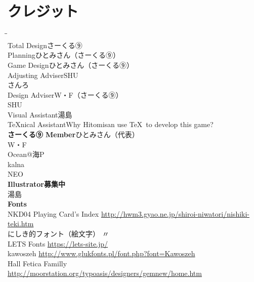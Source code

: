 \documentclass[line_length=22zw,number_of_lines=45,twocolumn]{jlreq}
\newcommand{\hmemph}[1]{\textbf{#1}}
\begin{document}
\onecolumn
\section{クレジット}
\begin{tabbing}
	\hspace{15\zw}\=\hspace{15\zw}\=\kill\\
	Total Design\>さーくる⑨\\
	Planning\>ひとみさん（さーくる⑨）\\
	Game Design\>ひとみさん（さーくる⑨）\\
	Adjusting Adviser\>SHU\\
	\>さんろ\\
	Design Adviser\>W・F（さーくる⑨）\\
	\>SHU\\
	Visual Assistant\>湯島\\
	\TeX nical Assistant\>Why Hitomisan use \TeX\ to develop this game?\\
	\hmemph{さーくる⑨ Member}\>ひとみさん（代表）\\
	\>W・F\\
	\>Ocean@海P\\
	\>kalna\\
	\>NEO\\
	\hmemph{Illustrator}\>\hmemph{募集中}\\
	湯島\\
	\hmemph{Fonts}\\
	{NKD04 Playing Card's Index}\>
		\url{http://hwm3.gyao.ne.jp/shiroi-niwatori/nishiki-teki.htm}\\
	{にしき的フォント（絵文字）}\>
		〃\\
	{LETS Fonts}\>
		\url{https://lets-site.jp/}\\
	{kawoszeh}\>
		\url{http://www.glukfonts.pl/font.php?font=Kawoszeh}\\
	Hall Fetica Familly\>
		\url{http://moorstation.org/typoasis/designers/gemnew/home.htm}\\
		
\end{tabbing}

\doclicenseThis
\end{document}
